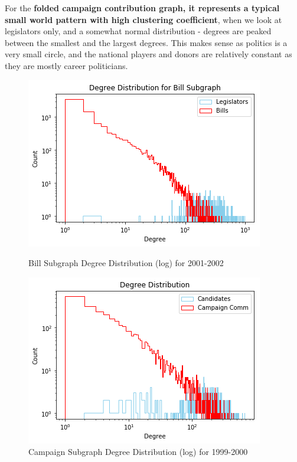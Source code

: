 \documentclass[12pt,twocolumn]{article}
\begin{document}
For the \textbf{folded campaign contribution graph, it represents a typical small world pattern with high clustering coefficient}, when we look at legislators only, and a somewhat normal distribution - degrees are peaked between the smallest and the largest degrees. This makes sense as politics is a very small circle, and the national players and donors are relatively constant as they are mostly career politicians.  
\begin{figure}
\centering
\begin{minipage}{0.45\linewidth}

\includegraphics[width=\linewidth]{2000_bill_degrees_log}
\caption{Bill Subgraph Degree Distribution (log) for 2001-2002}
\label{fig:2000_bill_degrees_log}
\end{minipage}\hfill
\begin{minipage}{0.45\linewidth}

\includegraphics[width=\linewidth]{2000_campaign_degrees_log}
\caption{Campaign Subgraph Degree Distribution (log) for 1999-2000}
\label{fig:2000_campaign_degrees_log}
 \end{minipage}
\end{figure}
\end{document}

